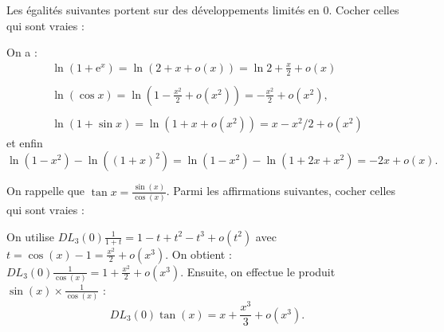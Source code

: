 \begin{question}
Les égalités suivantes portent sur des développements limités en $0$. Cocher celles qui sont vraies :
\begin{answers}  
\end{answers}
\begin{explanations}
On a : 
$$\begin{array}{l}\displaystyle \ln\left(1+\mathrm{e}^x\right)=\ln \left(2+x+o(x)\right)=\ln 2+\frac{x}{2}+o(x)\\ \\ \displaystyle \ln\left(\cos x\right)=\ln \left(1-\frac{x^2}{2}+o(x^2)\right)=-\frac{x^2}{2}+o(x^2),\\ \\ \displaystyle \ln\left(1+\sin x\right)=\ln \left(1+x+o(x^2)\right)=x-x^2/2+o(x^2)\end{array}$$ et enfin
$$\displaystyle \ln(1-x^2)-\ln \left((1+x)^2\right)=\ln(1-x^2)-\ln \left(1+2x+x^2\right)=-2x+o(x).$$
\end{explanations}
\end{question}

\begin{question}
On rappelle que $\displaystyle \tan x=\frac{\sin (x)}{\cos (x)}$. Parmi les affirmations suivantes, cocher celles qui sont vraies :
\begin{answers}  
\end{answers}
\begin{explanations}
On utilise $\displaystyle DL_3(0)\frac{1}{1+t}=1-t+t^2-t^3+o(t^2)$ avec $\displaystyle t=\cos (x)-1=\frac{x^2}{2}+o(x^3)$. On obtient :
$\displaystyle DL_3(0)\frac{1}{\cos (x)}=1+\frac{x^2}{2}+o(x^3)$. Ensuite, on effectue le produit $\displaystyle \sin (x)\times \frac{1}{\cos (x)}$ :
$$\displaystyle DL_3(0)\tan (x)=x+\frac{x^3}{3}+o(x^3).$$
\end{explanations}
\end{question}

